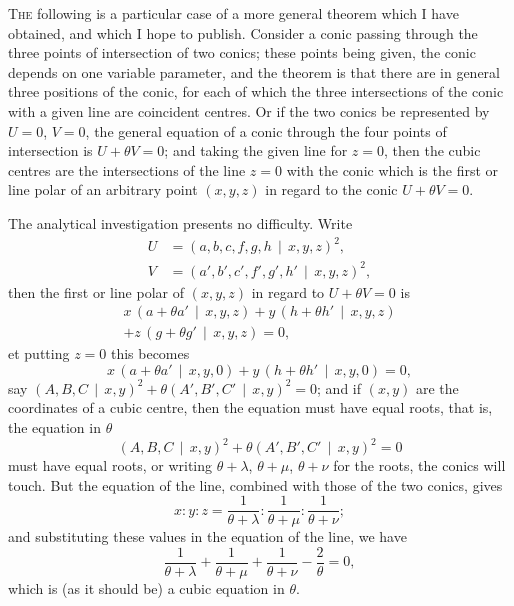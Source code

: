 \documentclass[11pt,a4paper]{article}
\theoremstyle{plain}
\theoremstyle{definition}
\begin{document}
\textsc{The} following is a particular case of a more general theorem which I have obtained, and which I hope to publish. Consider a conic passing through the three points of intersection of two conics; these points being given, the conic depends on one variable parameter, and the theorem is that there are in general three positions of the conic, for each of which the three intersections of the conic with a given line are coincident centres. Or if the two conics be represented by $U=0$, $V=0$, the general equation of a conic through the four points of intersection is $U+\theta V=0$; and taking the given line for $z=0$, then the cubic centres are the intersections of the line $z=0$ with the conic which is the first or line polar of an arbitrary point $(x, y, z)$ in regard to the conic $U+\theta V=0$.

The analytical investigation presents no difficulty. Write
\begin{align*}
U &= (a,b,c,f,g,h\,\mid\,x,y,z)^2, \\
V &= (a',b',c',f',g',h'\,\mid\,x,y,z)^2,
\end{align*}
then the first or line polar of $(x, y, z)$ in regard to $U+\theta V=0$ is
\begin{multline*}
x\,(a+\theta a'\,\mid\,x,y,z) + y\,(h+\theta h'\,\mid\,x,y,z) \\
+ z\,(g+\theta g'\,\mid\,x,y,z) = 0,
\end{multline*}
et putting $z=0$ this becomes
\[
x\,(a+\theta a'\,\mid\,x,y,0) + y\,(h+\theta h'\,\mid\,x,y,0) = 0,
\]
say $(A,B,C\,\mid\,x,y)^2 + \theta(A',B',C'\,\mid\,x,y)^2=0$; and if $(x, y)$ are the coordinates of a cubic centre, then the equation must have equal roots, that is, the equation in $\theta$
\[
(A,B,C\,\mid\,x,y)^2 + \theta(A',B',C'\,\mid\,x,y)^2 = 0
\]
must have equal roots, or writing $\theta + \lambda$, $\theta + \mu$, $\theta + \nu$ for the roots, the conics will touch. But the equation of the line, combined with those of the two conics, gives
\[
x : y : z = \frac{1}{\theta+\lambda} : \frac{1}{\theta+\mu} : \frac{1}{\theta+\nu};
\]
and substituting these values in the equation of the line, we have
\[
\frac{1}{\theta+\lambda} + \frac{1}{\theta+\mu} + \frac{1}{\theta+\nu} - \frac{2}{\theta} = 0,
\]
which is (as it should be) a cubic equation in $\theta$.
\end{document}
